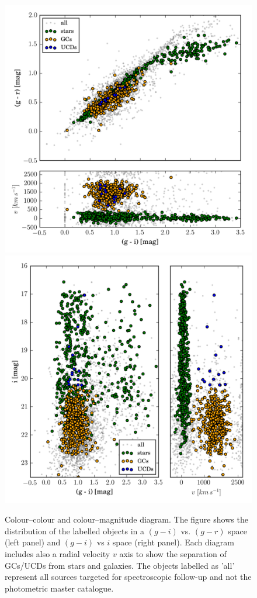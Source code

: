 \documentclass[useAMS,usenatbib]{mn2e}
\begin{document}
\begin{figure}
\centering
\includegraphics[width=\columnwidth]{figures/cc.png} 
\includegraphics[width=\columnwidth]{figures/cm.png} 
\caption{Colour--colour and colour--magnitude diagram. The figure shows the 
distribution of the labelled objects in a $(g-i)$ vs. $(g-r)$ space (left 
panel) and $(g-i)$ vs $i$ space (right panel). Each diagram includes also a 
radial velocity $v$ axis to show the separation of GCs/UCDs from stars and 
galaxies. The objects labelled as 'all' represent all sources targeted for 
spectroscopic follow-up and not the photometric master catalogue.}
\label{fig:cc}
\end{figure}
\end{document}
